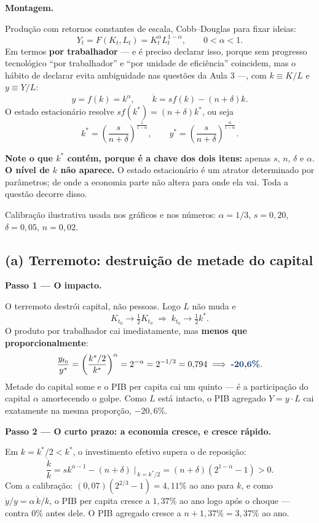 \documentclass[11pt, a4paper]{article}
\newcommand{\passo}[1]{\medskip\noindent\textbf{#1}\par\nobreak}
\newcommand{\resp}[1]{\textcolor{darkblue}{\textbf{#1}}}
\newcommand{\stst}{^{\ast}}
\begin{document}
\passo{Montagem.} Produção com retornos constantes de escala, Cobb--Douglas para fixar
ideias:
$$Y_t = F(K_t, L_t) = K_t^{\alpha} L_t^{1-\alpha}, \qquad 0<\alpha<1 .$$
Em termos \textbf{por trabalhador} --- e é preciso declarar isso, porque sem progresso
tecnológico ``por trabalhador'' e ``por unidade de eficiência'' coincidem, mas o hábito de
declarar evita ambiguidade nas questões da Aula 3 ---, com $k \equiv K/L$ e $y \equiv Y/L$:
$$y = f(k) = k^{\alpha}, \qquad
\dot k = s f(k) - (n+\delta)k .$$
O estado estacionário resolve $s f(k\stst) = (n+\delta) k\stst$, ou seja
$$k\stst = \left(\frac{s}{n+\delta}\right)^{\frac{1}{1-\alpha}}, \qquad
y\stst = \left(\frac{s}{n+\delta}\right)^{\frac{\alpha}{1-\alpha}} .$$

\textbf{Note o que $k\stst$ contém, porque é a chave dos dois itens:} apenas
$s$, $n$, $\delta$ e $\alpha$. \textbf{O nível de $k$ não aparece.} O estado estacionário é
um atrator determinado por parâmetros; de onde a economia parte não altera para onde ela
vai. Toda a questão decorre disso.

Calibração ilustrativa usada nos gráficos e nos números: $\alpha = 1/3$, $s = 0{,}20$,
$\delta = 0{,}05$, $n = 0{,}02$.

\subsection*{(a) Terremoto: destruição de metade do capital}

\passo{Passo 1 --- O impacto.} O terremoto destrói capital, não pessoas. Logo $L$ não muda
e
$$K_{t_0} \to \tfrac{1}{2}K_{t_0} \;\Longrightarrow\; k_{t_0} \to \tfrac{1}{2}k\stst .$$
O produto por trabalhador cai imediatamente, mas \textbf{menos que proporcionalmente}:
$$\frac{y_{t_0}}{y\stst} = \left(\frac{k\stst/2}{k\stst}\right)^{\alpha} = 2^{-\alpha}
= 2^{-1/3} = 0{,}794
\;\Longrightarrow\; \resp{-20{,}6\%} .$$
Metade do capital some e o PIB per capita cai um quinto --- é a participação do capital
$\alpha$ amortecendo o golpe. Como $L$ está intacto, o PIB agregado
$Y = y \cdot L$ cai exatamente na mesma proporção, $-20{,}6\%$.

\passo{Passo 2 --- O curto prazo: a economia cresce, e cresce rápido.} Em
$k = k\stst/2 < k\stst$, o investimento efetivo supera o de reposição:
$$\frac{\dot k}{k} = s k^{\alpha-1} - (n+\delta)
\;\Big|_{\,k = k\stst/2} = (n+\delta)\left(2^{1-\alpha} - 1\right) > 0 .$$
Com a calibração: $(0{,}07)(2^{2/3}-1) = 4{,}11\%$ ao ano para $k$, e como
$\dot y/y = \alpha\,\dot k/k$, o PIB per capita cresce a $1{,}37\%$ ao ano logo após o
choque --- contra $0\%$ antes dele. O PIB agregado cresce a $n + 1{,}37\% = 3{,}37\%$
ao ano.
\end{document}
